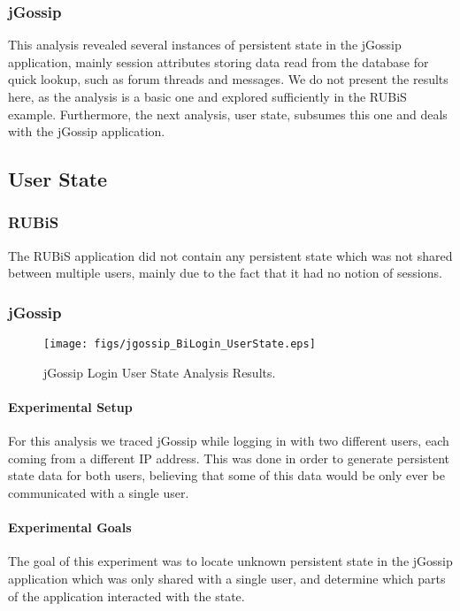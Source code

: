 \documentclass[msc,oneside]{ubcthesis}
\begin{document}
\subsubsection{jGossip} 

This analysis revealed several instances of persistent state in the jGossip application, mainly session attributes storing data read from the database for quick lookup, such as forum threads and messages. We do not present the results here, as the analysis is a basic one and explored sufficiently in the RUBiS example. Furthermore, the next analysis, user state, subsumes this one and deals with the jGossip application.

\subsection{User State}
\label{ana:user}
\subsubsection{RUBiS}

The RUBiS application did not contain any persistent state which was not shared between multiple users, mainly due to the fact that it had no notion of sessions.

\subsubsection{jGossip}

\begin{sidewaysfigure}
\centering
\scalebox{0.44}
{\texttt{[image: figs/jgossip\_BiLogin\_UserState.eps]}}
\caption{jGossip Login User State Analysis Results.} 
\label{fig:loginstate}
\end{sidewaysfigure}

\paragraph{Experimental Setup}
For this analysis we traced jGossip while logging in with two different users, each coming from a different IP address. This was done in order to generate persistent state data for both users, believing that some of this data would be only ever be communicated with a single user.

\paragraph{Experimental Goals}
The goal of this experiment was to locate unknown persistent state in the jGossip application which was only shared with a single user, and determine which parts of the application interacted with the state.
\end{document}

